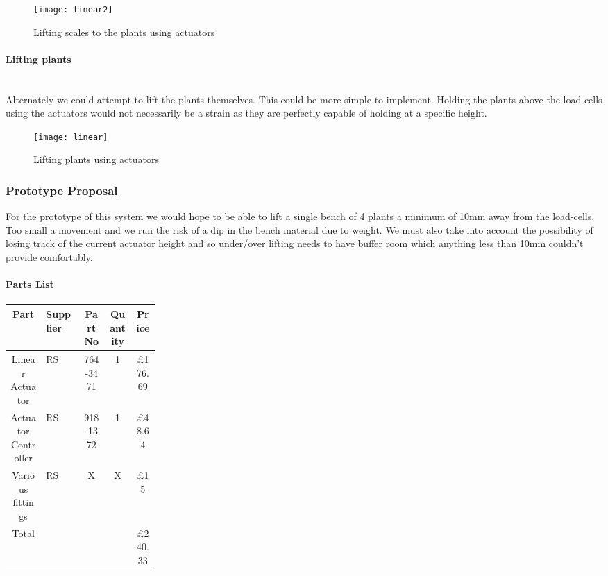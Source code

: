 \documentclass[11pt]{article}
\begin{document}
\begin{figure}[H]
  \begin{center}
    \texttt{[image: linear2]}
    \caption{Lifting scales to the plants using actuators}
  \end{center}
\end{figure}

\paragraph{Lifting plants}\mbox{}\\
Alternately we could attempt to lift the plants themselves. This could be more simple to implement.
Holding the plants above the load cells using the actuators would not necessarily be a strain as
they are perfectly capable of holding at a specific height.

\begin{figure}[H]
  \begin{center}
    \texttt{[image: linear]}
    \caption{Lifting plants using actuators}
  \end{center}
\end{figure}

\subsubsection{Prototype Proposal}
For the prototype of this system we would hope to be able to lift a single bench of 4 plants a minimum of 10mm away from
the load-cells. Too small a movement and we run the risk of a dip in the bench material due to weight. We must also take into account
the possibility of losing track of the current actuator height and so under/over lifting needs to have buffer room which anything less than 10mm
couldn't provide comfortably. 
\paragraph{Parts List}

\begin{center}
  \begin{longtable}{||c |  p{0.25\linewidth}   |c | c | c||} 
    \hline
    Part & Supplier & Part No & Quantity & Price \\ [0.5ex] 
    \hline\hline
    Linear Actuator & RS & 764-3471 & 1 & \pounds176.69 \\ 
    \hline
    Actuator Controller & RS & 918-1372 & 1  & \pounds48.64 \\
    \hline
    Various fittings & RS & X & X &  \pounds15 \\
    \hline
    \hline
    Total & & & & \pounds240.33 \\
    \hline
  \end{longtable}
\end{center}
\end{document}
